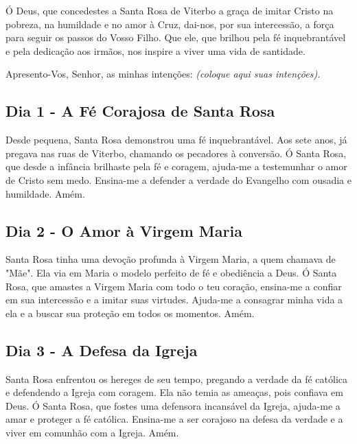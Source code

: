 \documentclass[a4paper,14pt]{extarticle} \usepackage[utf8]{inputenc}
\begin{document}
Ó Deus, que concedestes a Santa Rosa de Viterbo a graça de imitar Cristo na pobreza, na humildade e no amor à Cruz, dai-nos, por sua intercessão, a força para seguir os passos do Vosso Filho. Que ele, que brilhou pela fé inquebrantável e pela dedicação aos irmãos, nos inspire a viver uma vida de santidade.

Apresento-Vos, Senhor, as minhas intenções:
\textit{(coloque aqui suas intenções).}


\subsection{Dia 1 - A Fé Corajosa de Santa Rosa}
\underline{}

Desde pequena, Santa Rosa demonstrou uma fé inquebrantável. Aos sete anos, já pregava nas ruas de Viterbo, chamando os pecadores à conversão.
Ó Santa Rosa, que desde a infância brilhaste pela fé e coragem, ajuda-me a testemunhar o amor de Cristo sem medo. Ensina-me a defender a verdade do Evangelho com ousadia e humildade. Amém.

\underline{}


\subsection{Dia 2 - O Amor à Virgem Maria}


\underline{}

Santa Rosa tinha uma devoção profunda à Virgem Maria, a quem chamava de "Mãe". Ela via em Maria o modelo perfeito de fé e obediência a Deus.
Ó Santa Rosa, que amastes a Virgem Maria com todo o teu coração, ensina-me a confiar em sua intercessão e a imitar suas virtudes. Ajuda-me a consagrar minha vida a ela e a buscar sua proteção em todos os momentos. Amém.

\underline{}


\subsection{Dia 3 - A Defesa da Igreja}


\underline{}

Santa Rosa enfrentou os hereges de seu tempo, pregando a verdade da fé católica e defendendo a Igreja com coragem. Ela não temia as ameaças, pois confiava em Deus.
Ó Santa Rosa, que fostes uma defensora incansável da Igreja, ajuda-me a amar e proteger a fé católica. Ensina-me a ser corajoso na defesa da verdade e a viver em comunhão com a Igreja. Amém.
\end{document}
